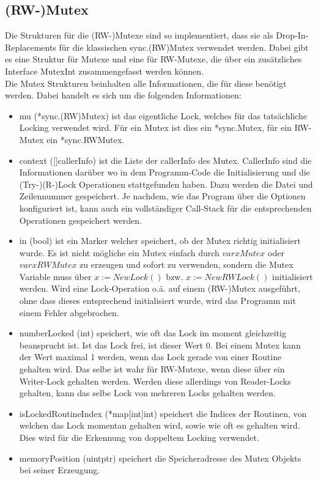 \subsection{(RW-)Mutex}
Die Strukturen für die (RW-)Mutexe sind so implementiert, dass sie als 
Drop-In-Replacements für die klassischen sync.(RW)Mutex verwendet werden.
Dabei gibt es eine Struktur für Mutexe und eine für RW-Mutexe, die über ein 
zusätzliches Interface MutexInt zusammengefasst werden können.\\
Die Mutex Strukturen beinhalten alle Informationen, die für diese benötigt werden.
Dabei handelt es sich um die folgenden Informationen:
\begin{itemize}[leftmargin=1.3em]
  \item mu (*sync.(RW)Mutex) ist das eigentliche Lock, welches für das tatsächliche Locking 
      verwendet wird. Für ein Mutex ist dies ein *sync.Mutex, für ein RW-Mutex
      ein *sync.RWMutex.
  \item context ([]callerInfo) ist die Liste der callerInfo des Mutex.
    CallerInfo sind die Informationen darüber wo in dem Programm-Code die 
    Initialisierung und die (Try-)(R-)Lock Operationen stattgefunden haben. 
    Dazu werden die Datei und Zeilennummer gespeichert. Je nachdem, wie das 
    Program über die Optionen konfiguriert ist, kann auch ein vollständiger 
    Call-Stack für die entsprechenden Operationen gespeichert werden. 
  \item in (bool) ist ein Marker welcher speichert, ob der Mutex richtig 
      initialisiert wurde. Es ist nicht mögliche ein Mutex einfach durch 
      $var x Mutex$ oder $var x RWMutex$ zu erzeugen und sofort zu verwenden, 
      sondern die Mutex Variable muss über $x := NewLock()$ bzw. 
      $x := NewRWLock()$ initialisiert werden. Wird eine Lock-Operation o.ä. 
      auf einem (RW-)Mutex ausgeführt, ohne dass dieses entsprechend initialisiert
      wurde, wird das Programm mit einem Fehler abgebrochen.
  \item numberLocked (int) speichert, wie oft das Lock im 
      moment gleichzeitig beansprucht ist. Ist das Lock frei, ist dieser Wert $0$.
      Bei einem Mutex kann der Wert maximal 1 werden, wenn das Lock gerade von 
      einer Routine gehalten wird. Das selbe ist wahr für RW-Mutexe, wenn diese 
      über ein Writer-Lock gehalten werden. Werden diese allerdings von 
      Reader-Locks gehalten, kann das selbe Lock von mehreren Locks gehalten 
      werden.
  \item isLockedRoutineIndex (*map[int]int) speichert die Indices der Routinen, von 
    welchen das Lock momentan gehalten wird, sowie wie oft es gehalten wird. 
    Dies wird für die Erkennung von doppeltem Locking verwendet.
  \item memoryPosition (uintptr) speichert die Speicheradresse des 
    Mutex Objekts bei seiner Erzeugung.
\end{itemize}
